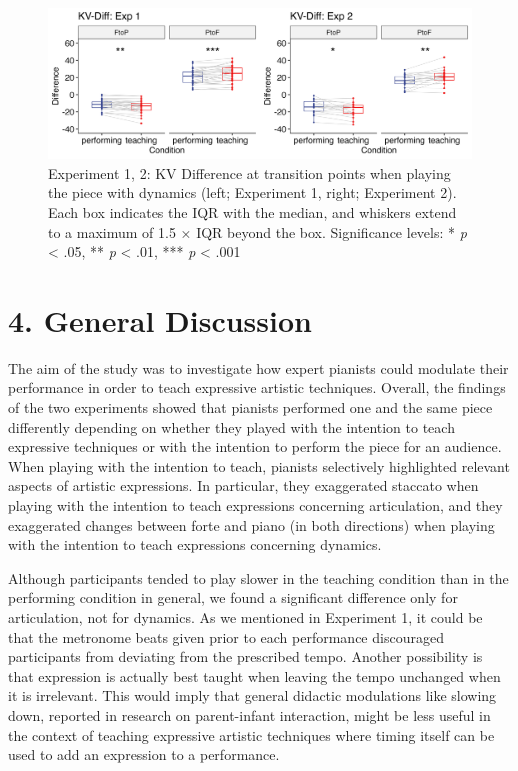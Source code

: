 \documentclass[
  english,
  man,floatsintext]{apa6}
\begin{document}
\begin{figure}
\includegraphics[width=1\linewidth]{manuscript_files/figure-latex/plot-vel-diff-1} \caption{\label{fig:vel-diff}Experiment 1, 2: KV Difference at transition points when playing the piece with dynamics (left; Experiment 1, right; Experiment 2). Each box indicates the IQR with the median, and whiskers extend to a maximum of 1.5 × IQR beyond the box. Significance levels: * \textit{p} < .05, ** \textit{p} < .01, *** \textit{p} < .001}\label{fig:plot-vel-diff}
\end{figure}

\newpage

\hypertarget{general-discussion}{%
\section{4. General Discussion}\label{general-discussion}}

The aim of the study was to investigate how expert pianists could modulate their performance in order to teach expressive artistic techniques. Overall, the findings of the two experiments showed that pianists performed one and the same piece differently depending on whether they played with the intention to teach expressive techniques or with the intention to perform the piece for an audience. When playing with the intention to teach, pianists selectively highlighted relevant aspects of artistic expressions. In particular, they exaggerated staccato when playing with the intention to teach expressions concerning articulation, and they exaggerated changes between forte and piano (in both directions) when playing with the intention to teach expressions concerning dynamics.

Although participants tended to play slower in the teaching condition than in the performing condition in general, we found a significant difference only for articulation, not for dynamics. As we mentioned in Experiment 1, it could be that the metronome beats given prior to each performance discouraged participants from deviating from the prescribed tempo. Another possibility is that expression is actually best taught when leaving the tempo unchanged when it is irrelevant. This would imply that general didactic modulations like slowing down, reported in research on parent-infant interaction, might be less useful in the context of teaching expressive artistic techniques where timing itself can be used to add an expression to a performance.
\end{document}
